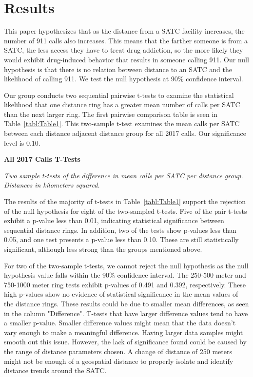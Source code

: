 \documentclass[12pt]{article}
\begin{document}
\section{Results}
\label{sec:result}

This paper hypothesizes that as the distance from a SATC facility increases, the number of 911 calls also increases. This means that the farther someone is from a SATC, the less access they have to treat drug addiction, so the more likely they would exhibit drug-induced behavior that results in someone calling 911. Our null hypothesis is that there is no relation between distance to an SATC and the likelihood of calling 911. We test the null hypothesis at 90\% confidence interval. 

Our group conducts two sequential pairwise t-tests to examine the statistical likelihood that one distance ring has a greater mean number of calls per SATC than the next larger ring. The first pairwise comparison table is seen in Table~\ref{tabl:Table1}. This two-sample t-test examines the mean calls per SATC between each distance adjacent distance group for all 2017 calls. Our significance level is 0.10.

\begin{table}[htbp]
\begin{center}

\end{center}

\caption{\textbf{All 2017 Calls T-Tests}}
\label{tabl:Table1}
\centering\textit{Two sample t-tests of the difference in mean calls per SATC per distance group.}
\textit{Distances in kilometers squared.}
\end{table}


The results of the majority of t-tests in Table~\ref{tabl:Table1} support the rejection of the null hypothesis for eight of the two-sampled t-tests. Five of the pair t-tests exhibit a p-value less than 0.01, indicating statistical significance between sequential distance rings. In addition, two of the tests show p-values less than 0.05, and one test presents a p-value less than 0.10. These are still statistically significant, although less strong than the groups mentioned above. 

For two of the two-sample t-tests, we cannot reject the null hypothesis as the null hypothesis value falls within the 90\% confidence interval. The 250-500 meter and 750-1000 meter ring tests exhibit p-values of 0.491 and 0.392, respectively. These high p-values show no evidence of statistical significance in the mean values of the distance rings. These results could be due to smaller mean differences, as seen in the column "Difference". T-tests that have larger difference values tend to have a smaller p-value. Smaller difference values might mean that the data doesn't vary enough to make a meaningful difference. Having larger data samples might smooth out this issue. However, the lack of significance found could be caused by the range of distance parameters chosen. A change of distance of 250 meters might not be enough of a geospatial distance to properly isolate and identify distance trends around the SATC.
\end{document}
